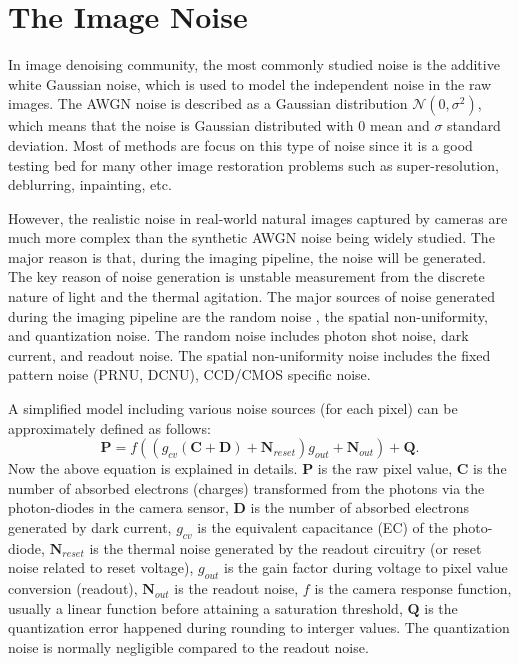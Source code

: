 \section{The Image Noise}
\label{sec:intro:current}

In image denoising community, the most commonly studied noise is the additive white Gaussian noise, which is used to model the independent noise in the raw images. The AWGN noise is described as a Gaussian distribution $\mathcal{N}(0,\sigma^{2})$, which means that the noise is Gaussian distributed with $0$ mean and $\sigma$ standard deviation. Most of methods are focus on this type of noise since it is a good testing bed for many other image restoration problems such as super-resolution, deblurring, inpainting, etc.

However, the realistic noise in real-world natural images captured by cameras are much more complex than the synthetic AWGN noise being widely studied. The major reason is that, during the imaging pipeline, the noise will be generated. The key reason of noise generation is unstable measurement from the discrete nature of light and the thermal agitation. The major sources of noise generated during the imaging pipeline are the random noise , the spatial non-uniformity, and quantization noise. The random noise includes photon shot noise, dark current, and readout noise. The spatial non-uniformity noise includes the fixed pattern noise (PRNU, DCNU), CCD/CMOS specific noise. 


A simplified model including various noise sources (for each pixel) can be approximately defined as follows:
\begin{equation}
\bm{P} = f((g_{cv}(\bm{C}+\bm{D})+\bm{N}_{reset})g_{out}+\bm{N}_{out})+\bm{Q}.
\end{equation}
Now the above equation is explained in details. 
$\bm{P}$ is the raw pixel value, 
$\bm{C}$ is the number of absorbed electrons (charges) transformed from the photons via the photon-diodes in the camera sensor,
$\bm{D}$ is the number of absorbed electrons generated by dark current,
$g_{cv}$ is the equivalent capacitance (EC) of the photo-diode,
$\bm{N}_{reset}$ is the thermal noise generated by the readout circuitry (or reset noise related to reset voltage),
$g_{out}$ is the gain factor during voltage to pixel value conversion (readout),
$\bm{N}_{out}$ is the readout noise,
$f$ is the camera response function, usually a linear function before attaining a saturation threshold,
$\bm{Q}$ is the quantization error happened during rounding to interger values. The quantization noise is normally negligible compared to the readout noise.

